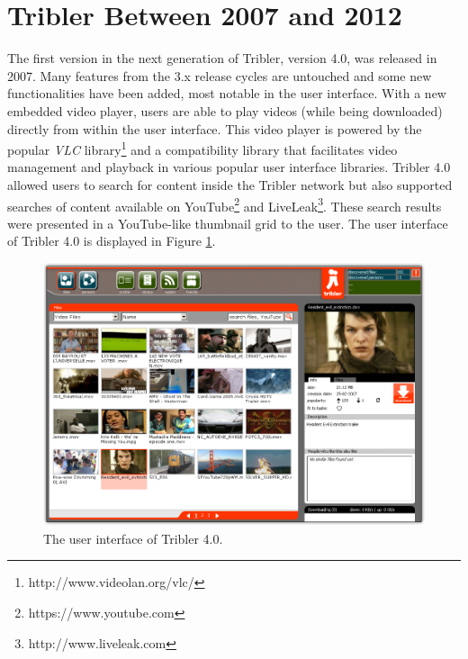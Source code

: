 \section{Tribler Between 2007 and 2012}
The first version in the next generation of Tribler, version 4.0, was released in 2007\cite{tribler4tf}. Many features from the 3.x release cycles are untouched and some new functionalities have been added, most notable in the user interface. With a new embedded video player, users are able to play videos (while being downloaded) directly from within the user interface. This video player is powered by the popular \emph{VLC} library\footnote{http://www.videolan.org/vlc/} and a compatibility library that facilitates video management and playback in various popular user interface libraries. Tribler 4.0 allowed users to search for content inside the Tribler network but also supported searches of content available on YouTube\footnote{https://www.youtube.com} and LiveLeak\footnote{http://www.liveleak.com}. These search results were presented in a YouTube-like thumbnail grid to the user. The user interface of Tribler 4.0 is displayed in Figure \ref{fig:tribler4}.\\

\begin{figure}[h!]
	\centering
	\includegraphics[width=1.0\columnwidth]{images/tribler4}
	\caption{The user interface of Tribler 4.0.}
	\label{fig:tribler4}
\end{figure}

